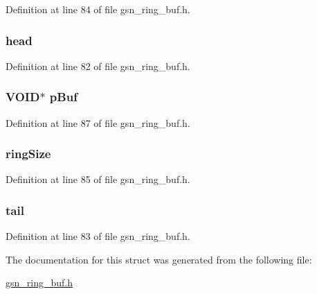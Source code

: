 Definition at line 84 of file gsn\_\-ring\_\-buf.h.

\hypertarget{a00191_ac088e3c86166df13e486e4f6d0b38007}{
\subsubsection[{head}]{ {\bf head}}}
\label{a00191_ac088e3c86166df13e486e4f6d0b38007}


Definition at line 82 of file gsn\_\-ring\_\-buf.h.

\hypertarget{a00191_ae73880d96d570d584a107c2b4ef84584}{
\subsubsection[{pBuf}]{\setlength{\rightskip}{0pt plus 5cm}VOID$\ast$ {\bf pBuf}}}
\label{a00191_ae73880d96d570d584a107c2b4ef84584}


Definition at line 87 of file gsn\_\-ring\_\-buf.h.

\hypertarget{a00191_ac903388e3f5809147f72582e4d6d2a85}{
\subsubsection[{ringSize}]{ {\bf ringSize}}}
\label{a00191_ac903388e3f5809147f72582e4d6d2a85}


Definition at line 85 of file gsn\_\-ring\_\-buf.h.

\hypertarget{a00191_ad1a0b175200ea5b01916f62e03994351}{
\subsubsection[{tail}]{ {\bf tail}}}
\label{a00191_ad1a0b175200ea5b01916f62e03994351}


Definition at line 83 of file gsn\_\-ring\_\-buf.h.



The documentation for this struct was generated from the following file:\begin{DoxyCompactItemize}
\item 
\hyperlink{a00578}{gsn\_\-ring\_\-buf.h}\end{DoxyCompactItemize}
